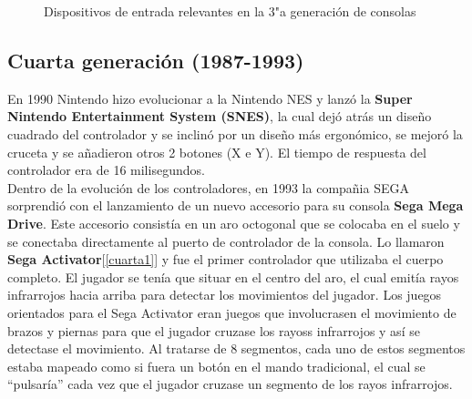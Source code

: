 \begin{figure}[!ht]
     \hfill
     \caption{Dispositivos de entrada relevantes en la 3"a  generaci\'on de consolas}
     \label{fig:tercera}
   \end{figure}

\subsection{Cuarta generaci\'on (1987-1993)}

En 1990 Nintendo hizo evolucionar a la Nintendo NES y lanz\'o la \textbf{Super Nintendo Entertainment System (SNES)}, la cual dej\'o atr\'as un dise\~no cuadrado del controlador y se inclin\'o por un dise\~no m\'as ergon\'omico, se mejor\'o la cruceta y se a\~nadieron otros 2 botones (X e Y). El tiempo de respuesta del controlador era de 16 milisegundos. \\

Dentro de la evoluci\'on de los controladores, en 1993 la compa\~nia SEGA sorprendi\'o con el lanzamiento de un nuevo accesorio para su consola \textbf{Sega Mega Drive}. Este accesorio consist\'ia en un aro octogonal que se colocaba en el suelo y se conectaba directamente al puerto de controlador de la consola. Lo llamaron \textbf{Sega Activator}[\ref{cuarta1}] y fue el primer controlador que utilizaba el cuerpo completo. El jugador se ten\'ia que situar en el centro del aro, el cual emit\'ia rayos infrarrojos hacia arriba para detectar los movimientos del jugador. Los juegos orientados para el Sega Activator eran juegos que involucrasen el movimiento de brazos y piernas para que el jugador cruzase los rayoss infrarrojos y as\'i se detectase el movimiento. Al tratarse de 8 segmentos, cada uno de estos segmentos estaba mapeado como si fuera un bot\'on en el mando tradicional, el cual se ``pulsar\'ia'' cada vez que el jugador cruzase un segmento de los rayos infrarrojos. \\

